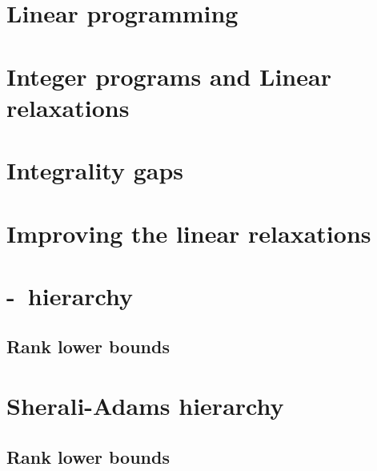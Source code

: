 \documentclass[a4paper,twoside,justified]{tufte-handout}
\begin{document}
\section{Linear programming}

\section{Integer programs and Linear relaxations}


\section{Integrality gaps}


\section{Improving the linear relaxations}


\section{\Lovasz-\Schrijver\ hierarchy}

\subsection{Rank lower bounds}

\section{Sherali-Adams hierarchy}

\subsection{Rank lower bounds}




\end{document}
